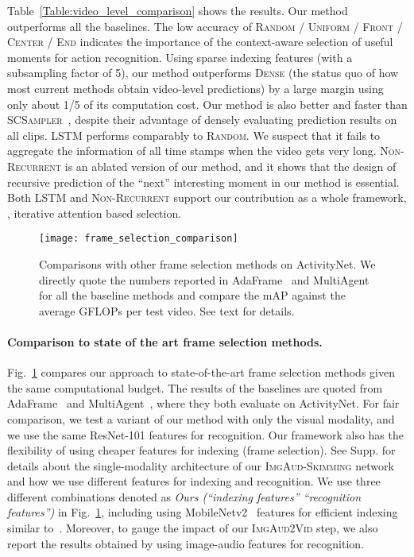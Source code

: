 Table~\ref{Table:video_level_comparison} shows the results. Our method outperforms all the baselines. The low accuracy of \textsc{Random} / \textsc{Uniform} / \textsc{Front} / \textsc{Center} / \textsc{End} indicates the importance of the context-aware selection of useful moments for action recognition. Using sparse indexing features (with a subsampling factor of 5), our method outperforms \textsc{Dense} (the status quo of how most current methods obtain video-level predictions) by a large margin using only about 1/5 of its computation cost. Our method is also better and faster than \textsc{SCSampler}~\cite{korbar2019scsampler}, despite their advantage of densely evaluating prediction results on all clips. \textsc{LSTM} performs comparably to \textsc{Random}. We suspect that it fails to aggregate the information of all time stamps when the video gets very long. \textsc{Non-Recurrent} is an ablated version of our method, and it shows that the design of recursive prediction of the ``next'' interesting moment in our method is essential. Both \textsc{LSTM} and \textsc{Non-Recurrent} support our contribution as a whole framework, \ie, iterative attention based selection.

\begin{figure}
    \center
    \texttt{[image: frame\_selection\_comparison]}
    \caption{Comparisons with other frame selection methods on ActivityNet. We directly quote the numbers reported in AdaFrame~\cite{wu2019adaframe} and MultiAgent~\cite{wu2019multiagent} for all the baseline methods and compare the mAP against the average GFLOPs per test video. See text for details.
      \vspace{-0.15in}}
    \label{Figure:frame_selection}
    \vspace{-0.1in}
\end{figure}

\vspace{-0.05in}
\paragraph{Comparison to state of the art frame selection methods.} Fig.~\ref{Figure:frame_selection} compares our approach to state-of-the-art frame selection methods given the same computational budget. The results of the baselines are quoted from AdaFrame~\cite{wu2019adaframe} and MultiAgent~\cite{wu2019multiagent}, where they both evaluate on ActivityNet. For fair comparison, we test a variant of our method with only the visual modality, and we use the same ResNet-101 features for recognition. Our framework also has the flexibility of using cheaper features for indexing (frame selection). See Supp. for details about the single-modality architecture of our \textsc{ImgAud-Skimming} network and how we use different features for indexing and recognition. We use three different combinations denoted as {\em Ours (``indexing features''  ``recognition features'')} in Fig.~\ref{Figure:frame_selection}, including using MobileNetv2~\cite{sandler2018mobilenetv2} features for efficient indexing similar to~\cite{wu2019adaframe}. Moreover, to gauge the impact of our \textsc{ImgAud2Vid} step, we also report the results obtained by using image-audio features for recognition.

